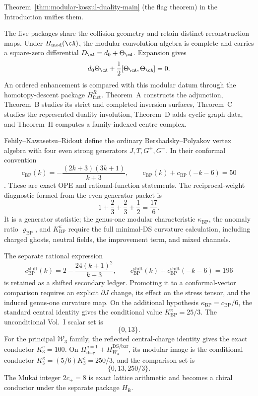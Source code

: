 \noindent
Theorem~\ref{thm:modular-koszul-duality-main} (the flag theorem)
in the Introduction unifies them.

\medskip\noindent
The five packages share the collision geometry and retain distinct
reconstruction maps.  Under \(H_{\mathrm{mod}}(\cA)\), the modular
convolution algebra is complete and carries a square-zero differential
\(D_\cA=d_0+\Theta_\cA\).  Expansion gives
\[
 d_0\Theta_\cA+\frac12[\Theta_\cA,\Theta_\cA]=0.
\]
An ordered enhancement is compared with this modular datum through
the homotopy-descent package \(H_{\mathrm{fact}}^R\).  Theorem~A
constructs the adjunction, Theorem~B studies its strict and completed
inversion surfaces, Theorem~C studies the represented duality
involution, Theorem~D adds cyclic graph data, and Theorem~H computes a
family-indexed centre complex.

\begin{convention}
\label{conv:theorem-c-bucket}
Fehily--Kawasetsu--Ridout define the ordinary Bershadsky--Polyakov
vertex algebra with four even strong generators $J,T,G^+,G^-$.  In
their conformal convention
\[
 c_{\mathrm{BP}}(k)
 =-\frac{(2k+3)(3k+1)}{k+3},
 \qquad
 c_{\mathrm{BP}}(k)+c_{\mathrm{BP}}(-k-6)=50
\]
\cite[Definition~2.1 and Equation~(2.2)]{FKR20}.  These are exact OPE
and rational-function statements.  The reciprocal-weight diagnostic
formed from the even generator packet is
\[
 1+\frac23+\frac23+\frac12=\frac{17}{6}.
\]
It is a generator statistic; the genus-one modular characteristic
$\kappa_{\mathrm{BP}}$, the anomaly ratio $\varrho_{\mathrm{BP}}$, and
$K^\kappa_{\mathrm{BP}}$ require the full minimal-DS curvature
calculation, including charged ghosts, neutral fields, the improvement
term, and mixed channels.

The separate rational expression
\[
 c_{\mathrm{BP}}^{\mathrm{shift}}(k)
 =2-\frac{24(k+1)^2}{k+3},
 \qquad
 c_{\mathrm{BP}}^{\mathrm{shift}}(k)
 +c_{\mathrm{BP}}^{\mathrm{shift}}(-k-6)=196
\]
is retained as a shifted secondary ledger.  Promoting it to a
conformal-vector comparison requires an explicit $\partial J$ change,
its effect on the stress tensor, and the induced genus-one curvature
 map.  On the additional hypothesis
 $\kappa_{\mathrm{BP}}=c_{\mathrm{BP}}/6$, the standard central identity
 gives the conditional value $K^\kappa_{\mathrm{BP}}=25/3$.
 The unconditional Vol.~I scalar set is
 \[
 \{0,13\}.
 \]
 For the principal $\mathcal W_3$ family, the reflected
 central-charge identity gives the exact conductor
 $K_3^c=100$.  On
 $H_{\mathrm{diag}}^{g=1}+H_{W_3}^{\mathrm{DS/bar}}$, its modular
 image is the conditional conductor
 $K_3^\kappa=(5/6)K_3^c=250/3$, and the comparison set is
 \[
 \{0,13,250/3\}.
 \]
 The Mukai integer
 $2c_+=8$ is exact lattice arithmetic and becomes a chiral conductor
 under the separate package $H_{\mathsf B}$.
\end{convention}


